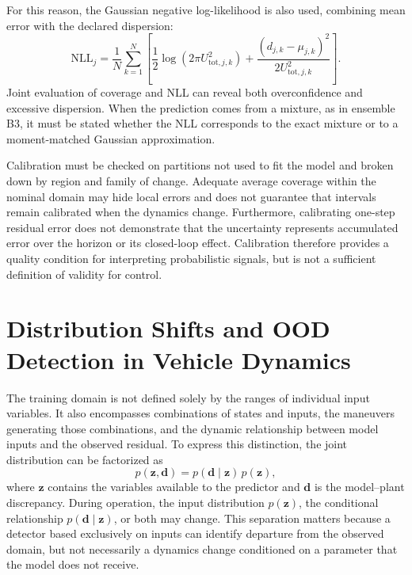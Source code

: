 \documentclass[12pt,a4paper]{report}
\begin{document}
For this reason, the Gaussian negative log-likelihood is also used, combining mean error with the declared dispersion:
\begin{equation}
    \mathrm{NLL}_j
    =
    \frac{1}{N}
    \sum_{k=1}^{N}
    \left[
        \frac{1}{2}\log\!\left(2\pi U^2_{\mathrm{tot},j,k}\right)
        +
        \frac{\left(d_{j,k}-\mu_{j,k}\right)^2}
             {2U^2_{\mathrm{tot},j,k}}
    \right].
    \label{eq:gaussian_predictive_nll}
\end{equation}
Joint evaluation of coverage and NLL can reveal both overconfidence and excessive dispersion. When the prediction comes from a mixture, as in ensemble B3, it must be stated whether the NLL corresponds to the exact mixture or to a moment-matched Gaussian approximation.

Calibration must be checked on partitions not used to fit the model and broken down by region and family of change. Adequate average coverage within the nominal domain may hide local errors and does not guarantee that intervals remain calibrated when the dynamics change. Furthermore, calibrating one-step residual error does not demonstrate that the uncertainty represents accumulated error over the horizon or its closed-loop effect. Calibration therefore provides a quality condition for interpreting probabilistic signals, but is not a sufficient definition of validity for control.

\section{Distribution Shifts and OOD Detection in Vehicle Dynamics}


The training domain is not defined solely by the ranges of individual input variables. It also encompasses combinations of states and inputs, the maneuvers generating those combinations, and the dynamic relationship between model inputs and the observed residual. To express this distinction, the joint distribution can be factorized as
\begin{equation}
    p(\mathbf{z},\mathbf{d})
    =
    p(\mathbf{d}\mid\mathbf{z})\,p(\mathbf{z}),
    \label{eq:joint_shift_factorization}
\end{equation}
where $\mathbf{z}$ contains the variables available to the predictor and $\mathbf{d}$ is the model--plant discrepancy. During operation, the input distribution $p(\mathbf{z})$, the conditional relationship $p(\mathbf{d}\mid\mathbf{z})$, or both may change. This separation matters because a detector based exclusively on inputs can identify departure from the observed domain, but not necessarily a dynamics change conditioned on a parameter that the model does not receive.
\end{document}

